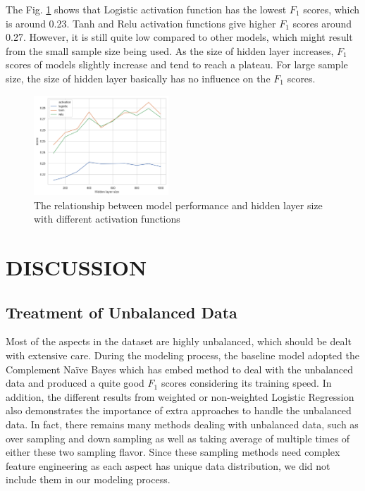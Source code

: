 \documentclass[compsoc]{IEEEtran}
\begin{document}
The Fig. \ref{fig:nn} shows that Logistic activation function has the lowest $F_1$ scores, which is around 0.23. Tanh and Relu activation functions give higher $F_1$ scores around 0.27. However, it is still quite low compared to other models, which might result from the small sample size being used. As the size of hidden layer increases, $F_1$ scores of models slightly increase and tend to reach a plateau. For large sample size, the size of hidden layer basically has no influence on the $F_1$ scores.

\begin{figure}[htbp]
\centering
\includegraphics[width=0.45\textwidth]{nn.png}
\caption{The relationship between model performance and hidden layer size with different activation functions}
\label{fig:nn}
\end{figure}


\section{DISCUSSION}

\subsection{Treatment of Unbalanced Data}

Most of the aspects in the dataset are highly unbalanced, which should be dealt with extensive care. During the modeling process, the baseline model adopted the Complement Na\"ive Bayes which has embed method to deal with the unbalanced data and produced a quite good $F_1$ scores considering its training speed. In addition, the different results from weighted or non-weighted Logistic Regression also demonstrates the importance of extra approaches to handle the unbalanced data. In fact, there remains many methods dealing with unbalanced data, such as over sampling and down sampling as well as taking average of multiple times of either these two sampling flavor. Since these sampling methods need complex feature engineering as each aspect has unique data distribution, we did not include them in our modeling process.
\end{document}
